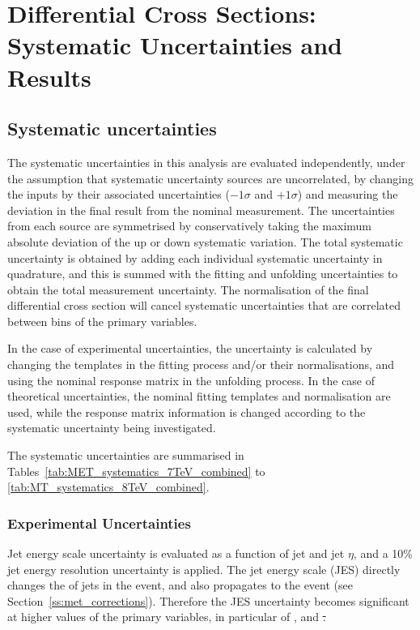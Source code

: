 \chapter{Differential Cross Sections: Systematic Uncertainties and Results}
\label{c:Differential_Cross_Section:systematics_and_results}

\section{Systematic uncertainties}
\label{s:systematic_uncertainties}
The systematic uncertainties in this analysis are evaluated independently, under the assumption that
systematic uncertainty sources are uncorrelated, by changing the inputs by their associated uncertainties
($-1\sigma$ and $+1\sigma$) and measuring the deviation in the final result from the nominal measurement.
The uncertainties from each source are symmetrised by conservatively taking the maximum absolute deviation of
the up or down systematic variation. The total systematic uncertainty is obtained by adding each individual
systematic uncertainty in quadrature, and this is summed with the fitting and unfolding uncertainties to
obtain the total measurement uncertainty. The normalisation of the final differential cross section will
cancel systematic uncertainties that are correlated between bins of the primary variables.

In the case of experimental uncertainties, the uncertainty is calculated by changing the templates in the
fitting process and/or their normalisations, and using the nominal \MADGRAPH response matrix in the unfolding
process. In the case of theoretical uncertainties, the nominal fitting templates and normalisation are used,
while the response matrix information is changed according to the systematic uncertainty being investigated.

The systematic uncertainties are summarised in Tables~\ref{tab:MET_systematics_7TeV_combined} to
\ref{tab:MT_systematics_8TeV_combined}.

\FloatBarrier

\subsection{Experimental Uncertainties}
\label{ss:experimental_uncertainties}

Jet energy scale uncertainty is evaluated as a function of jet \pt and jet $\eta$, and a 10\% jet energy
resolution uncertainty is applied. The jet energy scale (JES) directly changes the \pt of jets in
the event, and also propagates to the event \met (see
Section~\ref{ss:met_corrections}). Therefore the JES uncertainty becomes significant at higher
values of the primary variables, in particular of \met, \HT and \st.

